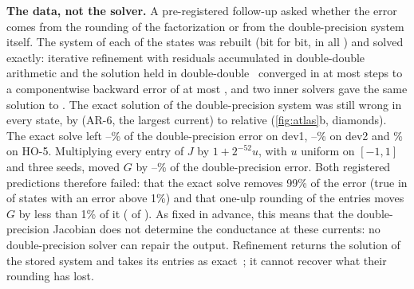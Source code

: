 \documentclass[11pt]{article}
\begin{document}
\textbf{The data, not the solver.} A pre-registered follow-up asked whether the error comes from the rounding of the
factorization or from the double-precision system itself. The system of each of the \ssStates{} states was rebuilt (bit
for bit, in all \ssRepro{}) and solved exactly: iterative refinement with residuals accumulated in double-double
arithmetic and the solution held in double-double~\cite{Higham2002,Demmel2006} converged in at most \ssIterMax{} steps to a componentwise backward error of at most
\ssOmegaMax{}, and two inner solvers gave the same solution to \ssMbMax{}. The exact solution of the double-precision
system was still wrong in every state, by \ssExactMin{} (AR-6, the largest current) to \ssExactMax{} relative
(\cref{fig:atlas}b, diamonds). The exact solve left \ssShareOneMin--\ssShareOneMax\% of the
double-precision error on dev1, \ssShareTwoMin--\ssShareTwoMax\% on dev2 and \ssShareThree\% on HO-5. Multiplying every
entry of $J$ by $1 + 2^{-52}u$, with $u$ uniform on $[-1, 1]$ and three seeds, moved $G$ by \ssSdblMin--\ssSdblMax\% of
the double-precision error. Both registered predictions therefore failed: that the exact solve removes 99\% of the error (true in
\ssPMoneOk{} of \ssGate{} states with an error above 1\%) and that one-ulp rounding of the entries moves $G$ by less than
1\% of it (\ssPMtwoOk{} of \ssGate{}). As fixed in advance, this means that the double-precision Jacobian does not
determine the conductance at these currents: no double-precision solver can repair the output. Refinement returns
the solution of the stored system and takes its entries as exact~\cite{Demmel2006}; it cannot recover what their
rounding has lost.
\end{document}
